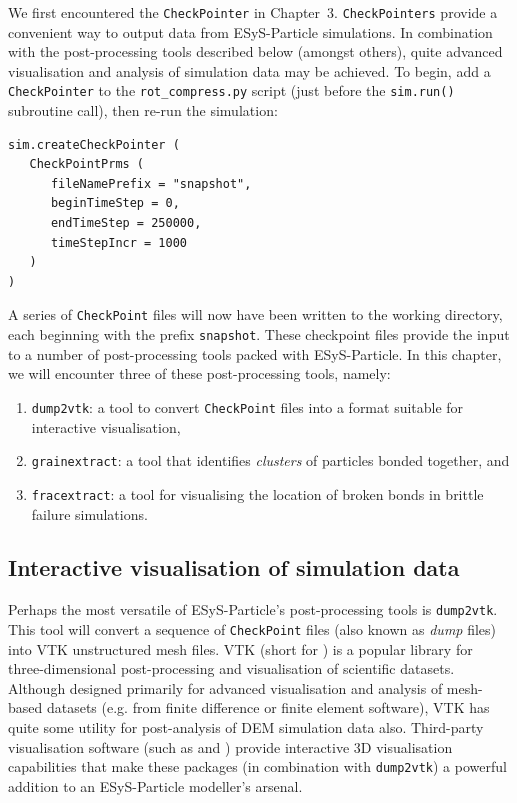 We first encountered the \texttt{CheckPointer} in Chapter~3. \texttt{CheckPointers} provide a convenient way to output data from ESyS-Particle simulations. In combination with the post-processing tools described below (amongst others), quite advanced visualisation and analysis of simulation data may be achieved. To begin, add a \texttt{CheckPointer} to the \texttt{rot\_compress.py} script (just before the \texttt{sim.run()} subroutine call), then re-run the simulation:

\begin{verbatim}
sim.createCheckPointer (
   CheckPointPrms (
      fileNamePrefix = "snapshot",
      beginTimeStep = 0,
      endTimeStep = 250000,
      timeStepIncr = 1000
   )
)
\end{verbatim}

\noindent 
A series of \texttt{CheckPoint} files will now have been written to the working directory, each beginning with the prefix \texttt{snapshot}. These checkpoint files provide the input to a number of post-processing tools packed with ESyS-Particle. In this chapter, we will encounter three of these post-processing tools, namely:

\begin{enumerate}
   \item \texttt{dump2vtk}: a tool to convert \texttt{CheckPoint} files into a format suitable for interactive visualisation,
   \item \texttt{grainextract}: a tool that identifies \emph{clusters} of particles bonded together, and
   \item \texttt{fracextract}: a tool for visualising the location of broken bonds in brittle failure simulations.
\end{enumerate}

\subsection{Interactive visualisation of simulation data}

Perhaps the most versatile of ESyS-Particle's post-processing tools is \texttt{dump2vtk}. This tool will convert a sequence of \texttt{CheckPoint} files (also known as \emph{dump} files) into VTK unstructured mesh files. VTK (short for ) is a popular library for three-dimensional post-processing and visualisation of scientific datasets. Although designed primarily for advanced visualisation and analysis of mesh-based datasets (e.g. from finite difference or finite element software), VTK has quite some utility for post-analysis of DEM simulation data also. Third-party visualisation software (such as  and ) provide interactive 3D visualisation capabilities that make these packages (in combination with \texttt{dump2vtk}) a powerful addition to an ESyS-Particle modeller's arsenal.  

